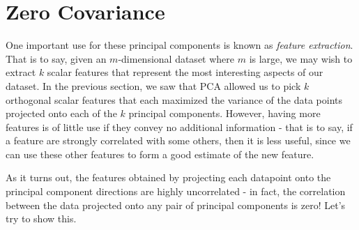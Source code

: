 \documentclass[letterpaper]{article}
\theoremstyle{remark}
\begin{document}
\section{Zero Covariance}
One important use for these principal components is known as \emph{feature extraction}. That is to say, given an $m$-dimensional dataset where $m$ is large, we may wish to extract $k$ scalar features that represent the most interesting aspects of our dataset. In the previous section, we saw that PCA allowed us to pick $k$ orthogonal scalar features that each maximized the variance of the data points projected onto each of the $k$ principal components. However, having more features is of little use if they convey no additional information - that is to say, if a feature are strongly correlated with some others, then it is less useful, since we can use these other features to form a good estimate of the new feature.

As it turns out, the features obtained by projecting each datapoint onto the principal component directions are highly uncorrelated - in fact, the correlation between the data projected onto any pair of principal components is zero! Let's try to show this.
\end{document}
